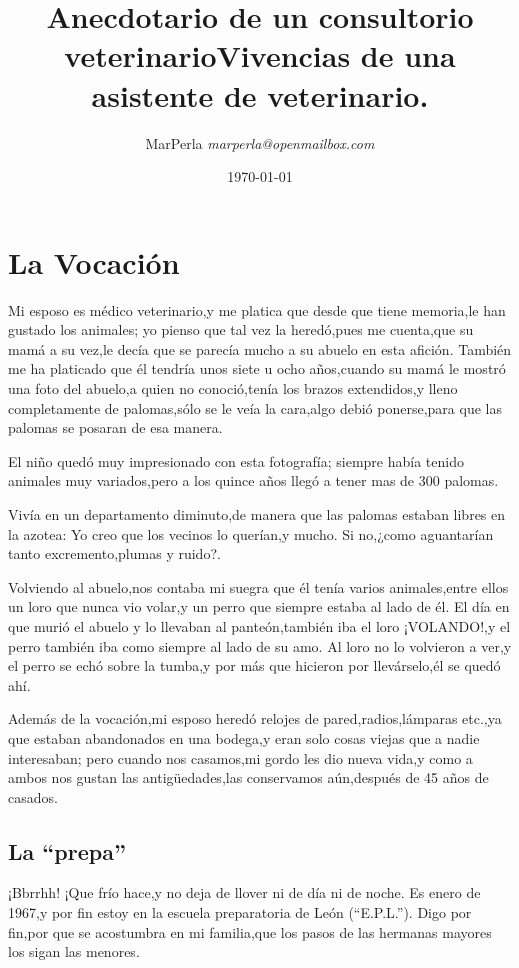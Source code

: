 \documentclass[letterpaper,12pt]{book}
\title{{\sffamily \huge Anecdotario de un consultorio veterinario}{\calligra{}Vivencias de una asistente de veterinario.}}
\author{{\Large  MarPerla }\itshape{}marperla@openmailbox.com }
\date{\today}
\begin{document}
\maketitle
\tableofcontents
\chapter{La Vocación}
Mi esposo es médico veterinario,y me platica que desde que tiene memoria,le han gustado los animales; yo pienso que tal vez la heredó,pues me cuenta,que su mamá a su vez,le decía que se parecía mucho a su abuelo en esta afición. También me ha platicado que él tendría unos siete u ocho años,cuando su mamá le mostró una foto del abuelo,a quien no conoció,tenía los brazos extendidos,y lleno completamente de palomas,sólo se le veía la cara,algo debió ponerse,para que las palomas se posaran de esa manera. 

El niño quedó muy impresionado con esta fotografía; siempre había tenido animales muy variados,pero a los quince años llegó a tener mas de 300 palomas. 

Vivía en un departamento diminuto,de manera que las palomas estaban libres en la azotea: Yo creo que los vecinos lo querían,y mucho. Si no,¿como aguantarían tanto excremento,plumas y ruido?.

Volviendo al  abuelo,nos contaba mi suegra que él tenía varios animales,entre ellos un loro que nunca vio volar,y un perro que siempre estaba al lado de él. El día en que murió el abuelo y lo llevaban al panteón,también iba el loro ¡VOLANDO!,y el perro también iba como siempre al lado de su amo. Al loro no lo volvieron a ver,y el perro se echó sobre la tumba,y por más que hicieron por llevárselo,él se quedó ahí. 

Además de la vocación,mi esposo heredó relojes de pared,radios,lámparas etc.,ya que estaban abandonados en una bodega,y eran solo cosas viejas que a nadie interesaban; pero cuando nos casamos,mi gordo les dio nueva vida,y como a ambos nos gustan las antigüedades,las conservamos aún,después de 45 años de casados.
\section*{La ``prepa''}
¡Bbrrhh! ¡Que frío hace,y no deja de llover ni de día ni de noche. Es enero de 1967,y por fin estoy en la escuela preparatoria de León (``E.P.L.''). Digo por fin,por que se acostumbra en mi familia,que los pasos de las hermanas mayores los sigan las menores.
\end{document}
